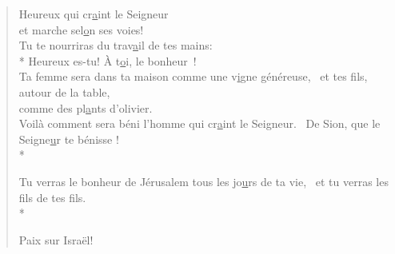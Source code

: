 
\begin{verse}

Heureux qui cr\underline{a}int le Seigneur \\
et marche sel\underline{o}n ses voies! \\
Tu te nourriras du trav\underline{a}il de tes mains: \\*
Heureux es-tu! À t\underline{o}i, le bonheur ! \\

Ta femme sera dans ta maison
comme une v\underline{i}gne généreuse,~\psalmstar
et tes fils, autour de la table, \\
comme des pl\underline{a}nts d’olivier. \\

Voilà comment sera béni
l’homme qui cr\underline{a}int le Seigneur.~\psalmstar
{}De Sion, que le Seigne\underline{u}r te bénisse ! \\*

Tu verras le bonheur de Jérusalem
tous les jo\underline{u}rs de ta vie,~\psalmstar
{}et tu verras les f\underline{i}ls de tes fils. \\*

Paix sur Israël! \\
\end{verse}

